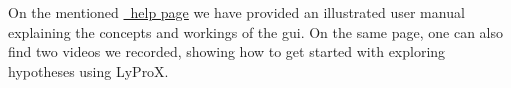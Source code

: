 \documentclass[\relativeRoot/main.tex]{subfiles}
\begin{document}
On the mentioned \href{https://lyprox.org/dashboard/help}{~help page} we have provided an illustrated user manual explaining the concepts and workings of the \gls{gui}. On the same page, one can also find two videos we recorded, showing how to get started with exploring hypotheses using LyProX.
\end{document}
